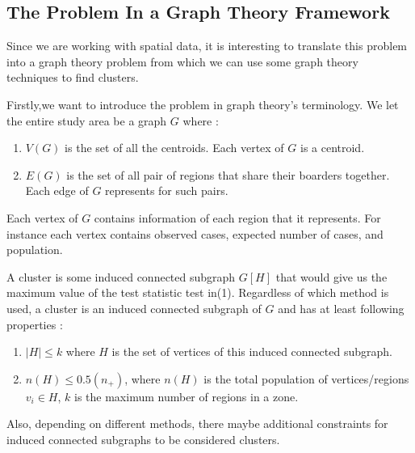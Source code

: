 \documentclass[12pt]{article}
\begin{document}
				\subsection{The Problem In a Graph Theory Framework} 
				
				Since we are working with spatial data, it is interesting to translate this problem into a graph theory problem from which we can use some graph theory techniques to find clusters. 
				
				Firstly,we want to introduce the problem in graph theory's terminology. We let the entire study area be a graph $G$ where : \\
				\begin{enumerate}
					
				\item $V(G)$ is the set of all the centroids. Each vertex of $G$ is a centroid. \\
				\item $E(G)$ is the set of all pair of regions that share their boarders together. Each edge of $G$ represents for such pairs.\\
				\end{enumerate}
				
				Each vertex of $G$ contains information of each region that it represents. For instance  each vertex contains observed cases, expected number of cases, and population.
				
				A cluster is some induced connected subgraph $G[H]$ that would give us the maximum value of the test statistic test in(1). Regardless of which method is used, a cluster is an induced connected subgraph of $G$ and has at least following properties : \\
				\begin{enumerate}
					
					\item $|H| \leq k $ where $H$ is the set of vertices of this induced connected subgraph.
					\item $n(H) \leq 0.5(n_+)$, where $n(H)$ is the total population of vertices/regions $v_i \in H$, $k$ is the maximum number of regions in a zone. 
				\end{enumerate}
				Also, depending on different methods, there maybe additional constraints for induced connected subgraphs to be considered clusters.\\ 	
			
\end{document}
